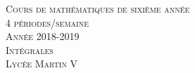 \documentclass[a4paper,fontsize=13pt]{scrreprt}
\theoremstyle{plain}
\theoremstyle{definition}
\begin{document}
	
\begin{titlepage}
	
	\newcommand{\HRule}{\rule{\linewidth}{0.4mm}} %
	
	\center %
	
	
	\vspace{4cm}
	
	\textsc{\Large Cours de mathématiques de sixième année \\ 4 périodes/semaine \\ Année 2018-2019}\\[0.3cm]
	\vspace{9.4cm}
	\textsc{\LARGE Intégrales}\\[0.6cm] %
	\vspace{9.8cm}
	\textsc{\Large Lycée Martin V}\\[0.3cm] %
	

	
\end{titlepage}
	

\tableofcontents
\end{document}
